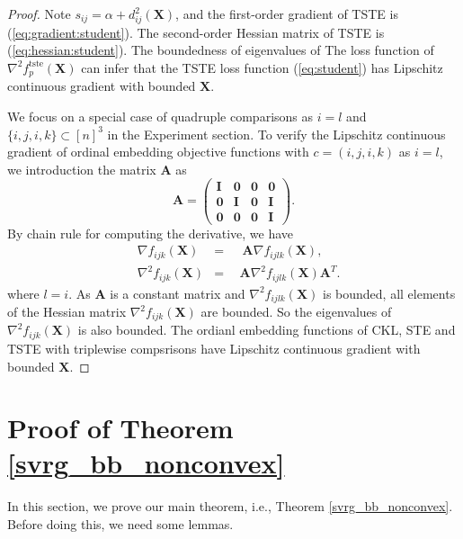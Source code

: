 \documentclass[./sbb_ordinal_embedding_aaai18.tex]{subfiles}%
\begin{document}
\begin{proof}
		Note $s_{ij} = \alpha+d^2_{ij}(\mathbf{X})$, and the first-order gradient of TSTE is (\ref{eq:gradient:student}).
		The second-order Hessian matrix of TSTE is (\ref{eq:hessian:student}). The boundedness of eigenvalues of The loss function of $\nabla^2 f^{\text{tste}}_p(\mathbf{X})$ can infer that the TSTE loss function (\ref{eq:student}) has Lipschitz continuous gradient with bounded $\mathbf{X}$.
		
		We focus on  a special case of quadruple comparisons as $i=l$ and $\{i,j,i,k\}\subset[n]^3$ in the Experiment section. To verify the Lipschitz continuous gradient of ordinal embedding objective functions with $c=(i,j,i,k)$ as $i=l$, we introduction the matrix $\mathbf{A}$ as
		\begin{equation}
		\mathbf{A} =
		\left(\begin{array}{rrrr}
		\mathbf{I} & \mathbf{0} & \mathbf{0} & \mathbf{0}\\
		\mathbf{0} & \mathbf{I} & \mathbf{0} & \mathbf{I}\\
		\mathbf{0} & \mathbf{0} & \mathbf{0} & \mathbf{I}
		\end{array}\right).
		\end{equation}
		By chain rule for computing the derivative, we have
		\begin{equation}
		\begin{aligned}
		& \nabla f_{ijk}(\mathbf{X}) &=&\ \ \ \mathbf{A}\nabla f_{ijlk}(\mathbf{X}),\\
		& \nabla^2 f_{ijk}(\mathbf{X}) &=&\ \ \mathbf{A}\nabla^2 f_{ijlk}(\mathbf{X})\mathbf{A}^T.
		\end{aligned}
		\end{equation}
		where $l = i$. As $\mathbf{A}$ is a constant matrix and $\nabla^2 f_{ijlk}(\mathbf{X})$ is bounded, all elements of the Hessian matrix $\nabla^2 f_{ijk}(\mathbf{X})$ are bounded. So the eigenvalues of $\nabla^2 f_{ijk}(\mathbf{X})$ is also bounded. The ordianl embedding functions of CKL, STE and TSTE with triplewise compsrisons have Lipschitz continuous gradient with bounded $\mathbf{X}$.
	\end{proof}



\section{Proof of Theorem \ref{svrg_bb_nonconvex}}

In this section, we prove our main theorem, i.e., Theorem \ref{svrg_bb_nonconvex}. Before doing this, we need some lemmas.
\end{document}
